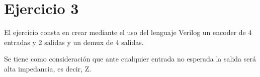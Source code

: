 \section{Ejercicio 3}
\noindent
El ejercicio consta en crear mediante el uso del lenguaje Verilog un encoder de 4 entradas y 2 salidas y un demux de 4 salidas.\par
Se tiene como consideración que ante cualquier entrada no esperada la salida será alta impedancia, es decir, Z.